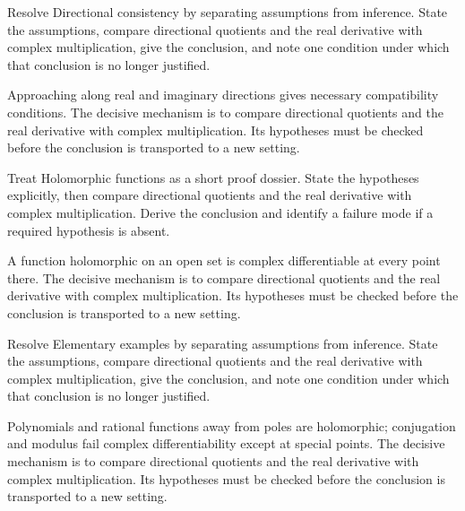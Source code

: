 \begin{problem}\label{prob:iv01-problem-03}
Resolve Directional consistency by separating assumptions from inference. State the assumptions, compare directional quotients and the real derivative with complex multiplication, give the conclusion, and note one condition under which that conclusion is no longer justified.
\end{problem}
\begin{solution}
Approaching along real and imaginary directions gives necessary compatibility conditions. The decisive mechanism is to compare directional quotients and the real derivative with complex multiplication. Its hypotheses must be checked before the conclusion is transported to a new setting.
\end{solution}

\begin{problem}\label{prob:iv01-problem-04}
Treat Holomorphic functions as a short proof dossier. State the hypotheses explicitly, then compare directional quotients and the real derivative with complex multiplication. Derive the conclusion and identify a failure mode if a required hypothesis is absent.
\end{problem}
\begin{solution}
A function holomorphic on an open set is complex differentiable at every point there. The decisive mechanism is to compare directional quotients and the real derivative with complex multiplication. Its hypotheses must be checked before the conclusion is transported to a new setting.
\end{solution}

\begin{problem}\label{prob:iv01-problem-05}
Resolve Elementary examples by separating assumptions from inference. State the assumptions, compare directional quotients and the real derivative with complex multiplication, give the conclusion, and note one condition under which that conclusion is no longer justified.
\end{problem}
\begin{solution}
Polynomials and rational functions away from poles are holomorphic; conjugation and modulus fail complex differentiability except at special points. The decisive mechanism is to compare directional quotients and the real derivative with complex multiplication. Its hypotheses must be checked before the conclusion is transported to a new setting.
\end{solution}

